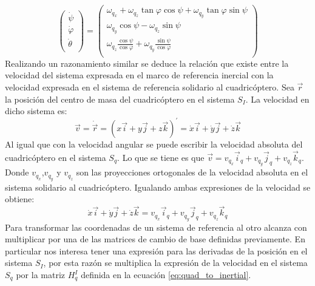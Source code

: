 \documentclass[main]{subfiles}
\begin{document}
\begin{equation}
\left(\begin{array}{c}
\dot{\psi}\\
\dot{\varphi}\\
\dot{\theta}\\
\end{array}\right)=\left(\begin{array}{c}
\omega_{q_x} + \omega_{q_z}\tan\varphi \cos\psi + \omega_{q_y}\tan\varphi \sin\psi\\
\omega_{q_y}\cos \psi - \omega_{q_z}\sin\psi\\
\omega_{q_z} \frac{\cos\psi}{\cos\varphi}  + \omega_{q_y}\frac{\sin\psi}{\cos\varphi} \\
\end{array}\right)
\label{eq:euler}
\end{equation}
Realizando un razonamiento similar se deduce la relaci\'on que existe entre la velocidad del sistema expresada en el marco de referencia inercial con la velocidad expresada en el sistema de referencia solidario al cuadric\'optero. Sea $\vec{r}$ la posici\'on del centro de masa del cuadric\'optero en el sistema $S_I$. La velocidad en dicho sistema es:
\begin{equation}
\vec{v}=\dot{\vec{r}}=(x\vec{i}+y\vec{j}+z\vec{k})^\prime=\dot{x}\vec{i}+\dot{y}\vec{j}+\dot{z}\vec{k}
\end{equation}
Al igual que con la velocidad angular se puede escribir la velocidad absoluta del cuadric\'optero en el sistema $S_q$. Lo que se tiene es que $\vec{v} =v_{q_x}\vec{i}_q+v_{q_y}\vec{j}_q+v_{q_z}\vec{k}_q$. Donde $v_{q_x}$,$v_{q_y}$ y $v_{q_z}$ son las proyecciones ortogonales de la velocidad absoluta en el sistema solidario al cuadric\'optero. Igualando ambas expresiones de la velocidad se obtiene: 
\begin{equation}
\dot{x}\vec{i}+\dot{y}\vec{j}+\dot{z}\vec{k} = v_{q_x} \vec{i}_q+v_{q_y} \vec{j}_q+v_{q_z} \vec{k}_q
\end{equation}
Para transformar las coordenadas de un sistema de referencia al otro alcanza con multiplicar por una de las matrices de cambio de base definidas previamente. En particular nos interesa tener una expresi\'on para las derivadas de la posici\'on en el sistema $S_I$, por esta raz\'on se multiplica la expresi\'on de la velocidad en el sistema $S_q$ por la matriz $H_q^I$ definida en la ecuaci\'on \ref{eq:quad_to_inertial}.
 
\end{document}
